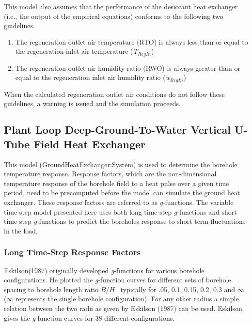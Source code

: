 This model also assumes that the performance of the desiccant heat exchanger (i.e., the output of the empirical equations) conforms to the following two guidelines.

\begin{enumerate}
\item The regeneration outlet air temperature (RTO) is always less than or equal to the regeneration inlet air temperature (\emph{T\(_{RegIn}\)})
\item The regeneration outlet air humidity ratio (RWO) is always greater than or equal to the regeneration inlet air humidity ratio (\emph{w\(_{RegIn}\)})
\end{enumerate}

When the calculated regeneration outlet air conditions do not follow these guidelines, a warning is issued and the simulation proceeds.

\subsection{Plant Loop Deep-Ground-To-Water Vertical U-Tube Field Heat Exchanger}\label{plant-loop-deep-ground-to-water-vertical-u-tube-field-heat-exchanger}

This model (GroundHeatExchanger:System) is used to determine the borehole temperature response. Response factors, which are the non-dimensional temperature response of the borehole field to a heat pulse over a given time period, need to be precomputed before the model can simulate the ground heat exchanger. These response factors are referred to as \emph{g}-functions. The variable time-step model presented here uses both long time-step \emph{g}-functions and short time-step \emph{g}-functions to predict the boreholes response to short term fluctuations in the load.

\subsubsection{Long Time-Step Response Factors}\label{long-time-step-response-factors}

Eskilson(1987) originally developed \emph{g}-functions for various borehole configurations. He plotted the \emph{g}-function curves for different sets of borehole spacing to borehole length ratio \(B/H\) ~typically for .05, 0.1, 0.15, 0.2, 0.3 and \(\infty\) (\(\infty\) represents the single borehole configuration). For any other radius a simple relation between the two radii as given by Eskilson (1987) can be used. Eskilson gives the \emph{g}-function curves for 38 different configurations.

